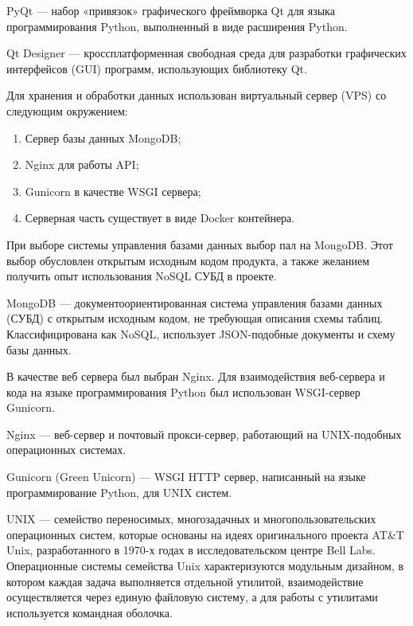 \begin{definition}
    PyQt --- набор «привязок» графического фреймворка Qt для языка программирования Python, выполненный в виде расширения Python.
\end{definition}

\begin{definition}
    Qt Designer --- кроссплатформенная свободная среда для разработки графических интерфейсов (GUI) программ, использующих библиотеку Qt.
\end{definition}

Для хранения и обработки данных использован виртуальный сервер (VPS) со следующим окружением:
\begin{enumerate}
    \item Сервер базы данных MongoDB;
    \item Nginx для работы API;
    \item Gunicorn в качестве WSGI сервера;
    \item Серверная часть существует в виде Docker контейнера.
\end{enumerate}

При выборе системы управления базами данных выбор пал на MongoDB. Этот выбор обусловлен открытым исходным кодом продукта,
а также желанием получить опыт использования NoSQL СУБД в проекте.
\begin{definition}
    MongoDB --- документоориентированная система управления базами данных (СУБД) с открытым исходным кодом,
    не требующая описания схемы таблиц. Классифицирована как NoSQL, использует JSON-подобные документы и схему базы данных.
\end{definition}

В качестве веб сервера был выбран Nginx. Для взаимодействия веб-сервера и кода на языке программирования Python был использован WSGI-сервер Gunicorn.
\begin{definition}
    Nginx --- веб-сервер и почтовый прокси-сервер, работающий на UNIX-подобных операционных системах.
\end{definition}

\begin{definition}
    Gunicorn (Green Unicorn) --- WSGI HTTP сервер, написанный на языке программирование Python, для UNIX систем.
\end{definition}

\begin{definition}
    UNIX --- семейство переносимых, многозадачных и многопользовательских операционных систем, которые основаны на идеях оригинального проекта AT\&T Unix,
    разработанного в 1970-х годах в исследовательском центре Bell Labs. Операционные системы семейства Unix характеризуются модульным дизайном,
    в котором каждая задача выполняется отдельной утилитой, взаимодействие осуществляется через единую файловую систему,
    а для работы с утилитами используется командная оболочка.
\end{definition}

